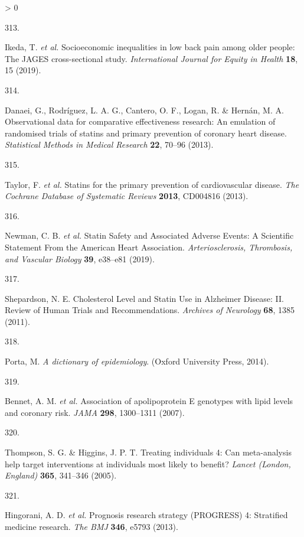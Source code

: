 \documentclass[a4paper, twoside]{templates/ociamthesis}
\newlength{\cslhangindent}
\newlength{\csllabelwidth}
\newenvironment{CSLReferences}[3] %
 {%
  \setlength{\parindent}{0pt}
  \ifodd #1 \everypar{\setlength{\hangindent}{\cslhangindent}}\ignorespaces\fi
  \ifnum #2 > 0
  \setlength{\parskip}{#2\baselineskip}
  \fi
 }%
 {}
\newcommand{\CSLLeftMargin}[1]{\parbox[t]{\maxof{\widthof{#1}}{\csllabelwidth}}{#1}}
\newcommand{\CSLRightInline}[1]{\parbox[t]{\linewidth - \csllabelwidth}{#1}}
\begin{document}
\begin{CSLReferences}{0}{0}
\leavevmode\hypertarget{ref-ikeda2019}{}%
\CSLLeftMargin{313. }
\CSLRightInline{Ikeda, T. \emph{et al.} Socioeconomic inequalities in low back pain among older people: The {JAGES} cross-sectional study. \emph{International Journal for Equity in Health} \textbf{18}, 15 (2019).}

\leavevmode\hypertarget{ref-danaei2013}{}%
\CSLLeftMargin{314. }
\CSLRightInline{Danaei, G., Rodríguez, L. A. G., Cantero, O. F., Logan, R. \& Hernán, M. A. Observational data for comparative effectiveness research: An emulation of randomised trials of statins and primary prevention of coronary heart disease. \emph{Statistical Methods in Medical Research} \textbf{22}, 70--96 (2013).}

\leavevmode\hypertarget{ref-taylor2013}{}%
\CSLLeftMargin{315. }
\CSLRightInline{Taylor, F. \emph{et al.} Statins for the primary prevention of cardiovascular disease. \emph{The Cochrane Database of Systematic Reviews} \textbf{2013}, CD004816 (2013).}

\leavevmode\hypertarget{ref-newman2019}{}%
\CSLLeftMargin{316. }
\CSLRightInline{Newman, C. B. \emph{et al.} Statin {Safety} and {Associated Adverse Events}: A {Scientific Statement From} the {American Heart Association}. \emph{Arteriosclerosis, Thrombosis, and Vascular Biology} \textbf{39}, e38--e81 (2019).}

\leavevmode\hypertarget{ref-shepardson2011}{}%
\CSLLeftMargin{317. }
\CSLRightInline{Shepardson, N. E. Cholesterol {Level} and {Statin Use} in {Alzheimer Disease}: {II}. {Review} of {Human Trials} and {Recommendations}. \emph{Archives of Neurology} \textbf{68}, 1385 (2011).}

\leavevmode\hypertarget{ref-porta2014}{}%
\CSLLeftMargin{318. }
\CSLRightInline{Porta, M. \emph{A dictionary of epidemiology}. ({Oxford University Press}, 2014).}

\leavevmode\hypertarget{ref-bennet2007}{}%
\CSLLeftMargin{319. }
\CSLRightInline{Bennet, A. M. \emph{et al.} Association of apolipoprotein {E} genotypes with lipid levels and coronary risk. \emph{JAMA} \textbf{298}, 1300--1311 (2007).}

\leavevmode\hypertarget{ref-thompson2005}{}%
\CSLLeftMargin{320. }
\CSLRightInline{Thompson, S. G. \& Higgins, J. P. T. Treating individuals 4: Can meta-analysis help target interventions at individuals most likely to benefit? \emph{Lancet (London, England)} \textbf{365}, 341--346 (2005).}

\leavevmode\hypertarget{ref-hingorani2013}{}%
\CSLLeftMargin{321. }
\CSLRightInline{Hingorani, A. D. \emph{et al.} Prognosis research strategy ({PROGRESS}) 4: Stratified medicine research. \emph{The BMJ} \textbf{346}, e5793 (2013).}


\end{CSLReferences}
\end{document}
